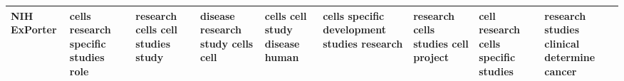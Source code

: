 \documentclass[11pt,a4paper]{article}
\begin{document}
\begin{appendices}
\begin{table*}[htb]
\begin{tiny}
\begin{tabular}{|p{}|p{}|p{}|p{}|p{}|p{}|p{}|p{}|p{}|}
    NIH ExPorter & cells \newline research \newline specific \newline studies \newline role & research \newline cells \newline cell \newline studies \newline study & disease \newline research \newline study \newline cells \newline cell & cells \newline cell \newline study \newline disease \newline human & cells \newline specific \newline development \newline studies \newline research & research \newline cells \newline studies \newline cell \newline project & cell \newline research \newline cells \newline specific \newline studies & research \newline studies \newline clinical \newline determine \newline cancer\\\hline

\end{tabular}
\end{tiny}
\end{table*}
\end{appendices}
\end{document}
